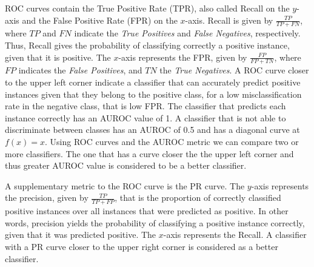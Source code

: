 \documentclass{acm_proc_article-sp}
\begin{document}
ROC curves contain the True Positive Rate (TPR), also called Recall on the $y$-axis and the False Positive Rate (FPR) on the $x$-axis. Recall is given by $\frac{TP}{TP + FN}$, where $TP$ and $FN$ indicate the \textit{True Positives} and \textit{False Negatives}, respectively. Thus, Recall gives the probability of classifying correctly a positive instance, given that it is positive. The $x$-axis represents the FPR, given by $\frac{FP}{FP + TN}$, where $FP$ indicates the \textit{False Positives}, and $TN$ the \textit{True Negatives}. A ROC curve closer to the upper left corner indicate a classifier that can accurately predict positive instances given that they belong to the positive class, for a low misclassification rate in the negative class, that is low FPR. The classifier that predicts each instance correctly has an AUROC value of 1. A classifier that is not able to discriminate between classes has an AUROC of 0.5 and has a diagonal curve at $f(x) = x$. Using ROC curves and the AUROC metric we can compare two or more classifiers. The one that has a curve closer the the upper left corner and thus greater AUROC value is considered to be a better classifier.

A supplementary metric to the ROC curve is the PR curve. The $y$-axis represents the precision, given by $\frac{TP}{TP + FP}$, that is the proportion of correctly classified positive instances over all instances that were predicted as positive. In other words, precision yields the probability of classifying a positive instance correctly, given that it was predicted positive. The $x$-axis represents the Recall. A classifier with a PR curve closer to the upper right corner is considered as a better classifier. 
\end{document}
